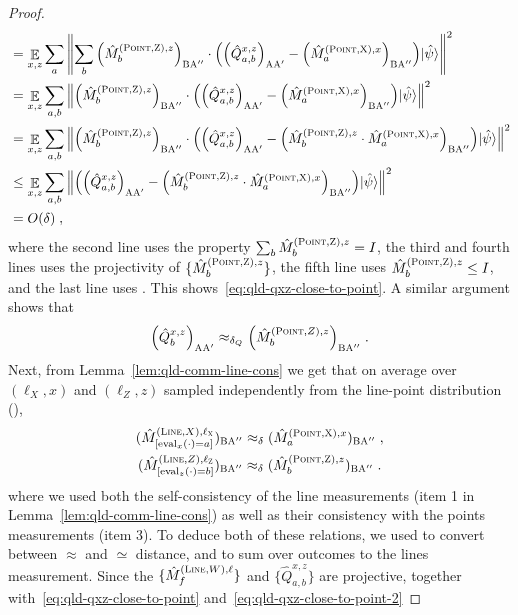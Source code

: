 \documentclass[11pt]{article}
\theoremstyle{definition}
\newcommand{\ket}[1]{|#1\rangle}
\newcommand{\norm}[1]{\left\| {#1} \right\|}
\newcommand{\E}{\mathop{\mathbb{E}}\displaylimits}
\newcommand{\labelstyle}[1]{\ensuremath{\textsc{#1}}\xspace}
\newcommand{\xpt}{\labelstyle{X}}
\newcommand{\zpt}{\labelstyle{Z}}
\newcommand{\alice}{\labelstyle{A}}
\newcommand{\bob}{\labelstyle{B}}
\newcommand{\typestyle}[1]{\ensuremath{\textsc{#1}}\xspace}
\renewcommand{\line}{\mathbf{\ell}}
\newcommand{\Point}{\typestyle{Point}}
\newcommand{\Line}{\typestyle{Line}}
\newcommand{\eval}{\mathrm{eval}}
\begin{document}
\begin{proof}
\begin{align*}
		&=\E_{x,z} \sum_a \norm{ \sum_b \Big ( \hat{M}^{(\Point,\zpt),z}_{b} \Big)_{\bob \alice''} \cdot  \Big( \Big( \hat{Q}^{x,z}_{a,b} \Big)_{\alice \alice'} - \Big ( \hat{M}^{(\Point,\xpt),x}_{a} \Big)_{\bob \alice''}  \Big) \ket{\hat{\psi}} }^2  \\
		&= \E_{x,z} \sum_{a,b}  \norm{  \Big ( \hat{M}^{(\Point,\zpt),z}_{b} \Big)_{\bob \alice''} \cdot  \Big( \Big( \hat{Q}^{x,z}_{a,b} \Big)_{\alice \alice'} - \Big ( \hat{M}^{(\Point,\xpt),x}_{a} \Big)_{\bob \alice''}  \Big) \ket{\hat{\psi}} }^2  \\
                &= \E_{x,z} \sum_{a,b} \norm{ \Big(  \hat{M}^{(\Point,\zpt),z}_{b} \Big)_{\bob \alice''} \cdot  \Big( \Big( \hat{Q}^{x,z}_{a,b} \Big)_{\alice \alice'} - \Big( \hat{M}^{(\Point, \zpt),z}_{b} \cdot \hat{M}^{(\Point,\xpt),x}_{a} \Big)_{\bob \alice''}  \Big) \ket{\hat{\psi}} }^2  \\
                &\leq \E_{x,z} \sum_{a,b} \norm{ \Big( \Big( \hat{Q}^{x,z}_{a,b} \Big)_{\alice \alice'} - \Big( \hat{M}^{(\Point, \zpt),z}_{b} \cdot \hat{M}^{(\Point,\xpt),x}_{a} \Big)_{\bob \alice''}  \Big) \ket{\hat{\psi}} }^2  \\
		&= O(\delta)\;,
	\end{align*} 
	where the second line uses the property $\sum_b \hat{M}^{(\Point,\zpt),z}_b = I$, the third and fourth lines uses the projectivity of $\{ \hat{M}^{(\Point,\zpt),z}_{b} \}$, the fifth line uses $\hat{M}^{(\Point, \zpt), z}_{b} \leq I$, and the last line uses . This shows~\eqref{eq:qld-qxz-close-to-point}. A similar argument shows that
	\begin{equation}\label{eq:qld-qxz-close-to-point-2}
	\Big ( \hat{Q}^{x,z}_{b} \Big)_{\alice \alice'} \approx_{\delta_Q} \Big (\hat{M}^{(\Point,Z),z}_{b} \Big)_{\bob \alice''}\;.
	\end{equation}
	Next, from Lemma~\ref{lem:qld-comm-line-cons} we get that on average over $(\line_X,x)$ and $(\line_Z,z)$ sampled independently from the line-point distribution (),
	\begin{gather}
	(\hat{M}^{(\Line,X),\line_\xpt}_{[\eval_x(\cdot) = a]})_{\bob \alice''} \approx_\delta  (\hat{M}^{(\Point,\xpt),x}_{a})_{\bob \alice''} \;,\\
	( \hat{M}^{(\Line,Z),\line_\zpt}_{[\eval_z(\cdot) = b]})_{\bob \alice''} \approx_\delta  (\hat{M}^{(\Point,\zpt),z}_{b})_{\bob \alice''}\;.
	\end{gather}
	where we used both the self-consistency of the line measurements (item 1 in Lemma~\ref{lem:qld-comm-line-cons}) as well as their consistency with the points measurements (item 3). To deduce both of these relations, we used  to convert between $\approx$ and $\simeq$ distance, and  to sum over outcomes to the lines measurement. Since the $\{\hat{M}^{(\Line,W),\line}_f \}$ and $\{ \hat{Q}^{x,z}_{a,b} \}$ are projective, together with~\eqref{eq:qld-qxz-close-to-point} and~\eqref{eq:qld-qxz-close-to-point-2}

\end{proof}
\end{document}
